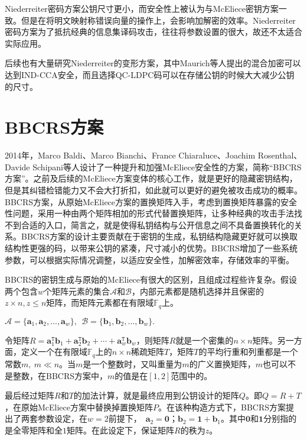 Niederreiter密码方案公钥尺寸更小，而安全性上被认为与McEliece密钥方案一致。但是在将明文映射称错误向量的操作上，会影响加解密的效率。Niederreiter密码方案为了抵抗经典的信息集译码攻击，往往将参数设置的很大，故还不太适合实际应用。

后续也有大量研究Niederreiter的变形方案，其中Maurich等人提出的混合加密可以达到IND-CCA安全，而且选择QC-LDPC码可以在存储公钥的时候大大减少公钥的尺寸。
\section{BBCRS方案}
2014年，Marco Baldi、Marco Bianchi、France Chiaraluce、Joachim Rosenthal、Davide Schipani等人设计了一种提升和加强McEliece安全性的方案，简称“BBCRS方案”。之前及后续的McEliece方案变体的核心工作，就是更好的隐藏密钥结构，但是其纠错检错能力又不会大打折扣，如此就可以更好的避免被攻击成功的概率。BBCRS方案，从原始McEliece方案的置换矩阵入手，考虑到置换矩阵暴露的安全性问题，采用一种由两个矩阵相加的形式代替置换矩阵，让多种经典的攻击手法找不到合适的入口，简言之，就是使得私钥结构与公开信息之间不具备置换转化的关系。BBCRS方案的设计主要贡献在于密钥的生成，私钥结构隐藏更好就可以换取结构性更强的码，以带来公钥的紧凑，尺寸减小的优势。BBCRS增加了一些系统参数，可以根据实际情况调整，以适应安全性，加解密效率，存储效率的平衡。

BBCRS的密钥生成与原始的McEliece有很大的区别，且组成过程些许复杂。假设两个包含$w$个矩阵元素的集合$\mathcal{A}$和$\mathcal{B}$，内部元素都是随机选择并且保密的$z \times n, z \leq n$矩阵，而矩阵元素都在有限域$\mathbb{F}_q$上。
\begin{center}
	$\mathcal{A} = \{\mathbf{a}_1,\mathbf{a}_2,...,\mathbf{a}_w\},~$$~\mathcal{B} = \{\mathbf{b}_1,\mathbf{b}_2,...,\mathbf{b}_w\}.$
\end{center}
\begin{flushleft}
	令矩阵$R = \mathbf{a}_1^\mathtt{T}\mathbf{b}_1 + \mathbf{a}_2^\mathtt{T}\mathbf{b}_2 + \cdots + \mathbf{a}_w^\mathtt{T}\mathbf{b}_w$，则矩阵$R$就是一个密集的$n \times n$矩阵。另一方面，定义一个在有限域$\mathbb{F}_q$上的$n \times n$稀疏矩阵$T$，矩阵$T$的平均行重和列重都是一个常数$m,~ m \ll n$。当$m$是一个整数时，又叫重量为$m$的广义置换矩阵，$m$也可以不是整数，在BBCRS方案中，$m$的值是在$[1,2]$范围中的。
\end{flushleft}

最后经过矩阵$R$和$T$的加法计算，就是最终应用到公钥设计的矩阵$Q$。即$Q=R+T$，在原始McEliece方案中替换掉置换矩阵$P$。在该种构造方式下，BBCRS方案提出了两套参数设定，在$w = 2$前提下，~$\mathbf{a}_2 = \mathbf{0}$；$\mathbf{b}_2=\mathbf{1} + \mathbf{b}_1$。其中$\mathbf{0}$和$\mathbf{1}$分别指的是全零矩阵和全$1$矩阵。在此设定下，保证矩阵$R$的秩为$z$。

